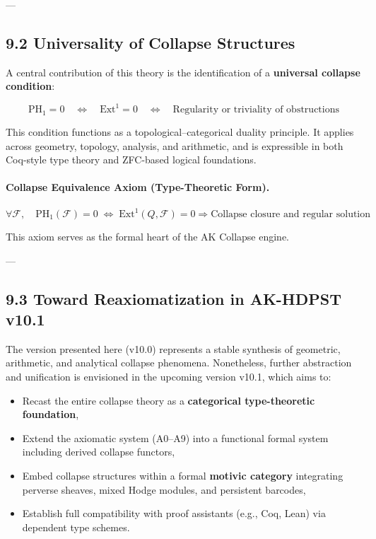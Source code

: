 \documentclass[11pt]{article}
\begin{document}
---

\subsection*{9.2 Universality of Collapse Structures}

A central contribution of this theory is the identification of a \textbf{universal collapse condition}:

\[
\mathrm{PH}_1 = 0 \quad \Leftrightarrow \quad \mathrm{Ext}^1 = 0 \quad \Leftrightarrow \quad \text{Regularity or triviality of obstructions}
\]

This condition functions as a topological–categorical duality principle.  
It applies across geometry, topology, analysis, and arithmetic, and is expressible in both Coq-style type theory and ZFC-based logical foundations.

\paragraph{Collapse Equivalence Axiom (Type-Theoretic Form).}
\[
\forall \mathcal{F}, \quad \mathrm{PH}_1(\mathcal{F}) = 0 \;\Leftrightarrow\; \mathrm{Ext}^1(Q, \mathcal{F}) = 0
\Rightarrow \text{Collapse closure and regular solution}
\]

This axiom serves as the formal heart of the AK Collapse engine.

---

\subsection*{9.3 Toward Reaxiomatization in AK-HDPST v10.1}

The version presented here (v10.0) represents a stable synthesis of geometric, arithmetic, and analytical collapse phenomena.  
Nonetheless, further abstraction and unification is envisioned in the upcoming version v10.1, which aims to:

\begin{itemize}
  \item Recast the entire collapse theory as a \textbf{categorical type-theoretic foundation},
  \item Extend the axiomatic system (A0–A9) into a functional formal system including derived collapse functors,
  \item Embed collapse structures within a formal \textbf{motivic category} integrating perverse sheaves, mixed Hodge modules, and persistent barcodes,
  \item Establish full compatibility with proof assistants (e.g., Coq, Lean) via dependent type schemes.
\end{itemize}
\end{document}
